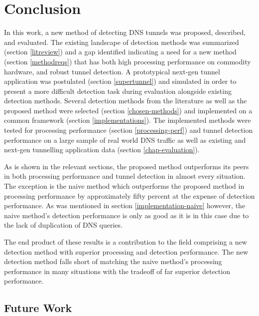 \documentclass[12pt]{report}
\theoremstyle{remark}
\theoremstyle{definition}
\theoremstyle{definition}
\theoremstyle{definition}
\begin{document}
\chapter{Conclusion}

In this work, a new method of detecting DNS tunnels was proposed, described, and
evaluated. The existing landscape of detection methods was summarized (section
\ref{litreview}) and a gap identified indicating a need for a new method
(section \ref{methodreqs}) that has both high processing performance on
commodity hardware, and robust tunnel detection. A prototypical next-gen tunnel
application was postulated (section \ref{supertunnel}) and simulated in order to
present a more difficult detection task during evaluation alongside existing
detection methods. Several detection methods from the literature as well as the
proposed method were selected (section \ref{chosen-methods}) and implemented on
a common framework (section \ref{implementations}). The implemented methods were
tested for processing performance (section \ref{processing-perf}) and tunnel
detection performance on a large sample of real world DNS traffic as well as
existing and next-gen tunnelling application data (section
\ref{chap-evaluation}).

As is shown in the relevant sections, the proposed method outperforms its peers
in both processing performance and tunnel detection in almost every situation.
The exception is the naive method which outperforms the proposed method in
processing performance by approximately fifty percent at the expense of
detection performance. As was mentioned in section \ref{implementation-naive}
however, the naive method's detection performance is only as good as it is in
this case due to the lack of duplication of DNS queries.

The end product of these results is a contribution to the field comprising a new
detection method with superior processing and detection performance. The new
detection method falls short of matching the naive method's processing
performance in many situations with the tradeoff of far superior detection
performance.

\section{Future Work}
\end{document}
